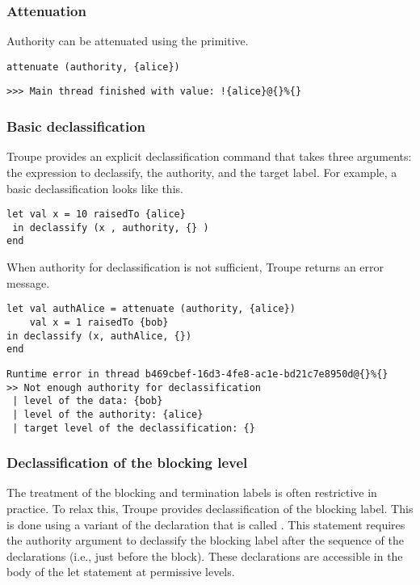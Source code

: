 \subsubsection{Attenuation}
Authority can be attenuated using the  primitive. 

\begin{lstlisting}
attenuate (authority, {alice})    
\end{lstlisting}
\begin{verbatim}
>>> Main thread finished with value: !{alice}@{}%{}    
\end{verbatim}

\subsubsection{Basic declassification}
Troupe provides an explicit declassification command  that takes three arguments: 
the expression to declassify, the authority, and the target label. For example, a basic declassification
looks like this. 
\begin{lstlisting}
let val x = 10 raisedTo {alice}
 in declassify (x , authority, {} )
end 
\end{lstlisting}

When authority for declassification is not sufficient, Troupe returns an error message.
\begin{lstlisting}
let val authAlice = attenuate (authority, {alice})
    val x = 1 raisedTo {bob}
in declassify (x, authAlice, {})
end     
\end{lstlisting}

\begin{lstlisting}
Runtime error in thread b469cbef-16d3-4fe8-ac1e-bd21c7e8950d@{}%{}
>> Not enough authority for declassification
 | level of the data: {bob}
 | level of the authority: {alice}
 | target level of the declassification: {}    
\end{lstlisting}

\subsubsection{Declassification of the blocking level}
\label{sec:pinidecl}
The treatment of the blocking and termination labels is often restrictive in practice. To relax this, 
Troupe provides declassification of the blocking label. This is done using 
a variant of the  declaration that is called . 
This statement requires the authority argument to declassify the blocking label 
after the sequence of the declarations (i.e., just before the  block).
These declarations are accessible in the body of the let statement at permissive
levels.

